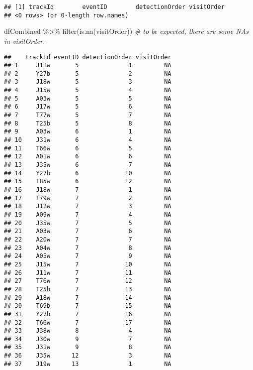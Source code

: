 \documentclass[
]{article}
\newenvironment{Shaded}{\begin{snugshade}}{\end{snugshade}}
\newcommand{\CommentTok}[1]{\textcolor[rgb]{0.56,0.35,0.01}{\textit{#1}}}
\newcommand{\FunctionTok}[1]{\textcolor[rgb]{0.00,0.00,0.00}{#1}}
\newcommand{\NormalTok}[1]{#1}
\newcommand{\SpecialCharTok}[1]{\textcolor[rgb]{0.00,0.00,0.00}{#1}}
\begin{document}
\begin{verbatim}
## [1] trackId        eventID        detectionOrder visitOrder    
## <0 rows> (or 0-length row.names)
\end{verbatim}

\begin{Shaded}
\begin{Highlighting}[]
\NormalTok{dfCombined }\SpecialCharTok{\%\textgreater{}\%}
  \FunctionTok{filter}\NormalTok{(}\FunctionTok{is.na}\NormalTok{(visitOrder)) }\CommentTok{\# to be expected, there are some NA\textquotesingle{}s in visitOrder.}
\end{Highlighting}
\end{Shaded}

\begin{verbatim}
##    trackId eventID detectionOrder visitOrder
## 1     J11w       5              1         NA
## 2     Y27b       5              2         NA
## 3     J18w       5              3         NA
## 4     J15w       5              4         NA
## 5     A03w       5              5         NA
## 6     J17w       5              6         NA
## 7     T77w       5              7         NA
## 8     T25b       5              8         NA
## 9     A03w       6              1         NA
## 10    J31w       6              4         NA
## 11    T66w       6              5         NA
## 12    A01w       6              6         NA
## 13    J35w       6              7         NA
## 14    Y27b       6             10         NA
## 15    T85w       6             12         NA
## 16    J18w       7              1         NA
## 17    T79w       7              2         NA
## 18    J12w       7              3         NA
## 19    A09w       7              4         NA
## 20    J35w       7              5         NA
## 21    A03w       7              6         NA
## 22    A20w       7              7         NA
## 23    A04w       7              8         NA
## 24    A05w       7              9         NA
## 25    J15w       7             10         NA
## 26    J11w       7             11         NA
## 27    T76w       7             12         NA
## 28    T25b       7             13         NA
## 29    A18w       7             14         NA
## 30    T69b       7             15         NA
## 31    Y27b       7             16         NA
## 32    T66w       7             17         NA
## 33    J38w       8              4         NA
## 34    J30w       9              7         NA
## 35    J31w       9              8         NA
## 36    J35w      12              3         NA
## 37    J19w      13              1         NA

\end{verbatim}
\end{document}
